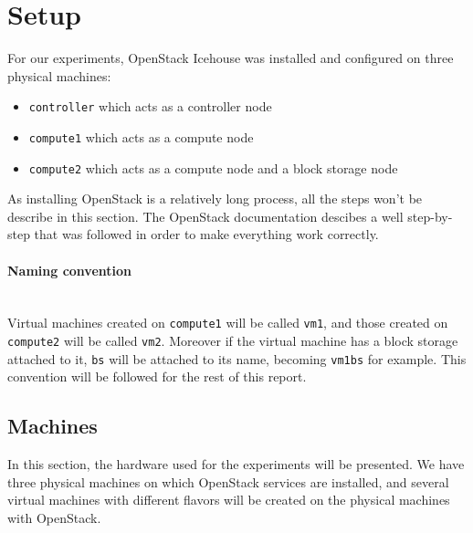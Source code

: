 \section{Setup}
\label{section_setup}
For our experiments, OpenStack Icehouse was installed and configured on three physical machines:

{
\singlespacing
\begin{itemize}
	\item{\texttt{controller} which acts as a controller node}
	\item{\texttt{compute1} which acts as a compute node}
	\item{\texttt{compute2} which acts as a compute node and a block storage node}
\end{itemize}
}

As installing OpenStack is a relatively long process, all the steps won't be describe in this section. The OpenStack documentation \cite{osinstall}
descibes a well step-by-step that was followed in order to make everything work correctly.


\paragraph{Naming convention}\mbox{}\\
Virtual machines created on \texttt{compute1} will be called \texttt{vm1}, and those created on \texttt{compute2} will be called \texttt{vm2}. Moreover if the virtual machine has a block storage attached to it, \texttt{bs} will be attached to its name, becoming \texttt{vm1bs} for example. This convention will be followed for the rest of this report.


\subsection{Machines}
In this section, the hardware used for the experiments will be presented. We have three physical machines on which OpenStack services are installed, and several virtual machines with different flavors will be created on the physical machines with OpenStack.


